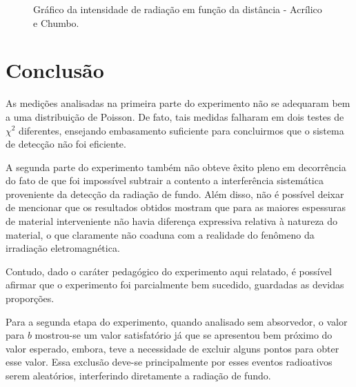 \documentclass{article}
\begin{document}
\begin{figure}[H]
    \centering
    \caption{Gráfico da intensidade de radiação em função da distância - Acrílico e Chumbo.}
    \label{com_abs}
\end{figure}


\section{Conclusão}
As medições analisadas na primeira parte do experimento não se adequaram bem a uma distribuição de Poisson. De fato, tais medidas falharam em dois testes de $\chi ^2$ diferentes, ensejando embasamento suficiente para concluirmos que o sistema de detecção não foi eficiente.

A segunda parte do experimento também não obteve êxito pleno em decorrência do fato de que foi impossível subtrair a contento a interferência sistemática proveniente da detecção da radiação de fundo. Além disso, não é possível deixar de mencionar que os resultados obtidos mostram que para as maiores espessuras de material interveniente não havia diferença expressiva relativa à natureza do material, o que claramente não coaduna com a realidade do fenômeno da irradiação eletromagnética.

Contudo, dado o caráter pedagógico do experimento aqui relatado, é possível afirmar que o experimento foi parcialmente bem sucedido, guardadas as devidas proporções.

Para a segunda etapa do experimento, quando analisado sem absorvedor, o valor para $b$ mostrou-se um valor satisfatório já que se apresentou bem próximo do valor esperado, embora, teve a necessidade de excluir alguns pontos para obter esse valor. Essa exclusão deve-se principalmente por esses eventos radioativos serem aleatórios, interferindo diretamente a radiação de fundo.
\end{document}
